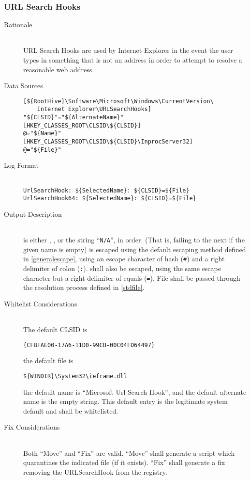 \subsubsection{URL Search Hooks}
\begin{description}
\item[Rationale] \hfill \\
URL Search Hooks are used by Internet Explorer in the event the user types in
something that is not an address in order to attempt to resolve a reasonable web
address.
\item[Data Sources] \hfill
\vspace{-\baselineskip}
\begin{verbatim}
[${RootHive}\Software\Microsoft\Windows\CurrentVersion\
    Internet Explorer\URLSearchHooks]
"${CLSID}"="${AlternateName}"
[HKEY_CLASSES_ROOT\CLSID\${CLSID}]
@="${Name}"
[HKEY_CLASSES_ROOT\CLSID\${CLSID}\InprocServer32]
@="${File}"
\end{verbatim}
\item[Log Format] \hfill \\
\verb|UrlSearchHook: ${SelectedName}: ${CLSID}=${File}| \\
\verb|UrlSearchHook64: ${SelectedName}: ${CLSID}=${File}|
\item[Output Description] \hfill \\
 is either , , or the string
``\verb|N/A|'', in order. (That is, failing to the next if the given name is
empty) \var{SelectedName} is escaped using the default escaping method defined
in \ref{generalescape}, using an escape character of hash (\verb|#|) and a right
delimiter of colon (\verb|:|). \var{CLSID} shall also be escaped, using the
same escape character but a right delimiter of equals (\verb|=|). File shall be
passed through the resolution process defined in \ref{stdfile}.
\item[Whitelist Considerations] \hfill \\
The default CLSID is
\vspace{-\baselineskip}
\begin{verbatim}
{CFBFAE00-17A6-11D0-99CB-00C04FD64497}
\end{verbatim}
the default file is
\vspace{-\baselineskip}
\begin{verbatim}
${WINDIR}\System32\ieframe.dll
\end{verbatim}
the default name
is ``Microsoft Url Search Hook'', and the default alternate name is the empty
string.
This default entry is the legitimate system default and shall be whitelisted.
\item[Fix Considerations] \hfill \\
Both ``Move'' and ``Fix'' are valid. ``Move'' shall generate a script which
quarantines the indicated file (if it exists). ``Fix'' shall generate a fix
removing the URLSearchHook from the registry.
\end{description}

